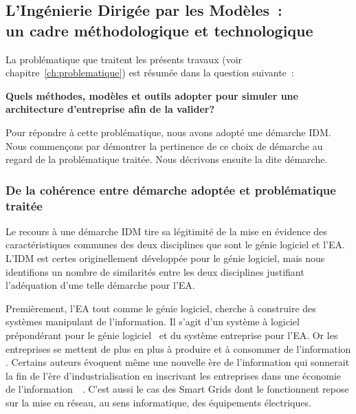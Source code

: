 \subsection{L'Ingénierie Dirigée par les Modèles~:\\ un cadre méthodologique et technologique}

    La problématique que traitent les présents travaux (voir
    chapitre~\ref{ch:problematique}) est résumée dans la question suivante~:

    {\bfseries Quels méthodes, modèles et outils adopter pour simuler une architecture d'entreprise afin de la valider?}

    Pour répondre à cette problématique, nous avons adopté une démarche IDM.
    Nous commençons par démontrer la pertinence de ce choix de démarche
    au regard de la problématique traitée.  Nous décrivons ensuite la dite démarche.

            \subsubsection{De la cohérence entre démarche adoptée et
    problématique traitée}

    Le recours à une démarche IDM tire sa légitimité de la mise en
    évidence des caractéristiques communes des deux disciplines que
    sont le génie logiciel et l'EA. L'IDM est certes originellement développée
    pour le génie logiciel, mais nous identifions un nombre de similarités
    entre les deux disciplines justifiant l'adéquation d'une telle démarche pour l'EA.

    Premièrement, l'EA tout comme le génie logiciel, cherche à construire
    des systèmes manipulant de l'information. Il s'agit d'un système à
    logiciel prépondérant pour le génie
    logiciel~\cite{jezequel2012ingenierie} et du système entreprise pour l'EA.
    Or les entreprises se mettent de plus en plus à produire et à
    consommer de l'information \cite{zachman1997enterprise}. Certains auteurs
    évoquent même une nouvelle ère de l'information qui sonnerait
    la fin de l'ère d'industrialisation en inscrivant les entreprises dans une économie
    de l'information~\cite{toffler1981third}~\cite{webster2014theories}. C'est aussi le cas
    des Smart Grids dont le fonctionnent repose sur la
    mise en réseau, au sens informatique, des équipements électriques.

